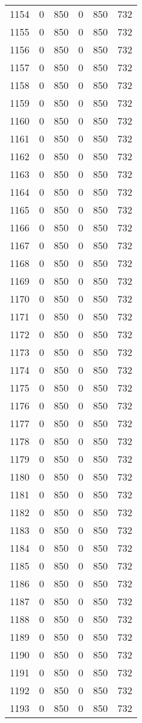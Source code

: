 \documentclass[a4paper]{ctexart}
\begin{document}
\begin{longtable}{p{1cm}|p{2cm}|p{2cm}|p{2cm}|P{2cm}|p{2cm}}
		1154&0&850&0&850&732\\
		1155&0&850&0&850&732\\
		1156&0&850&0&850&732\\
		1157&0&850&0&850&732\\
		1158&0&850&0&850&732\\
		1159&0&850&0&850&732\\
		1160&0&850&0&850&732\\
		1161&0&850&0&850&732\\
		1162&0&850&0&850&732\\
		1163&0&850&0&850&732\\
		1164&0&850&0&850&732\\
		1165&0&850&0&850&732\\
		1166&0&850&0&850&732\\
		1167&0&850&0&850&732\\
		1168&0&850&0&850&732\\
		1169&0&850&0&850&732\\
		1170&0&850&0&850&732\\
		1171&0&850&0&850&732\\
		1172&0&850&0&850&732\\
		1173&0&850&0&850&732\\
		1174&0&850&0&850&732\\
		1175&0&850&0&850&732\\
		1176&0&850&0&850&732\\
		1177&0&850&0&850&732\\
		1178&0&850&0&850&732\\
		1179&0&850&0&850&732\\
		1180&0&850&0&850&732\\
		1181&0&850&0&850&732\\
		1182&0&850&0&850&732\\
		1183&0&850&0&850&732\\
		1184&0&850&0&850&732\\
		1185&0&850&0&850&732\\
		1186&0&850&0&850&732\\
		1187&0&850&0&850&732\\
		1188&0&850&0&850&732\\
		1189&0&850&0&850&732\\
		1190&0&850&0&850&732\\
		1191&0&850&0&850&732\\
		1192&0&850&0&850&732\\
		1193&0&850&0&850&732\\

\end{longtable}
\end{document}
